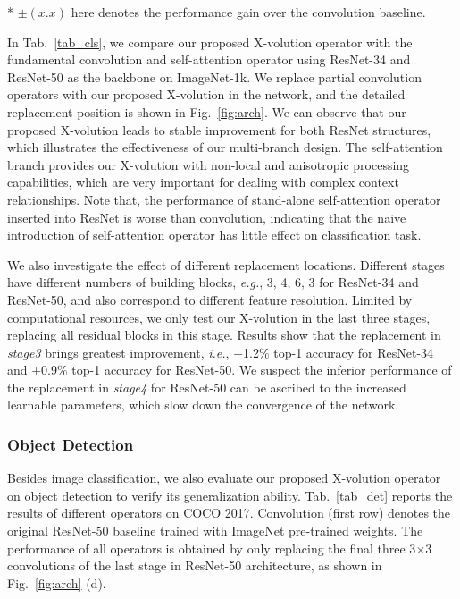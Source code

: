 \documentclass{article}
\begin{document}
\begin{table*}[t]
\begin{spacing}{1.2}
\begin{threeparttable}
\begin{tabular}{l|c|c|c|c|c|c}
\end{tabular}
	\begin{tablenotes}
\footnotesize
    \item[*] $\pm(x.x)$ here denotes the performance gain over the convolution baseline.
	\end{tablenotes}
\vspace{-3mm}
\end{threeparttable}
\end{spacing}
\end{table*}

In Tab.~\ref{tab_cls}, we compare our proposed X-volution operator with the fundamental convolution and self-attention operator using ResNet-34 and ResNet-50 as the backbone on ImageNet-1k. 
We replace partial convolution operators with our proposed X-volution in the network, and the detailed replacement position is shown in Fig.~\ref{fig:arch}.
We can observe that our proposed X-volution leads to stable improvement for both ResNet structures, which illustrates the effectiveness of our multi-branch design. The self-attention branch provides our X-volution with non-local and anisotropic processing capabilities, which are very important for dealing with complex context relationships.
Note that, the performance of stand-alone self-attention operator inserted into ResNet is worse than convolution, indicating that the naive introduction of self-attention operator has little effect on classification task.

We also investigate the effect of different replacement locations. 
Different stages have different numbers of building blocks, \emph{e.g.}, 3, 4, 6, 3 for ResNet-34 and ResNet-50, and also correspond to different feature resolution. 
Limited by computational resources, 
we only test our X-volution in the last three stages, replacing all residual blocks in this stage. 
Results show that the replacement in \textit{stage3} brings greatest improvement, \emph{i.e.}, +1.2\% top-1 accuracy for ResNet-34 and +0.9\% top-1 accuracy for ResNet-50. 
We suspect the inferior performance of the replacement in \textit{stage4} for ResNet-50 can be ascribed to the increased learnable parameters, which slow down the convergence of the network.





\subsubsection{Object Detection}
Besides image classification, we also evaluate our proposed X-volution operator on object detection to verify its generalization ability. Tab.~\ref{tab_det} reports the results of different operators on COCO 2017. 
Convolution (first row) denotes the original ResNet-50 baseline trained with ImageNet pre-trained weights. 
The performance of all operators is obtained by only replacing the final three 3$\times$3 convolutions of the last stage in ResNet-50 architecture, as shown in Fig.~\ref{fig:arch} (d). 
\end{document}

